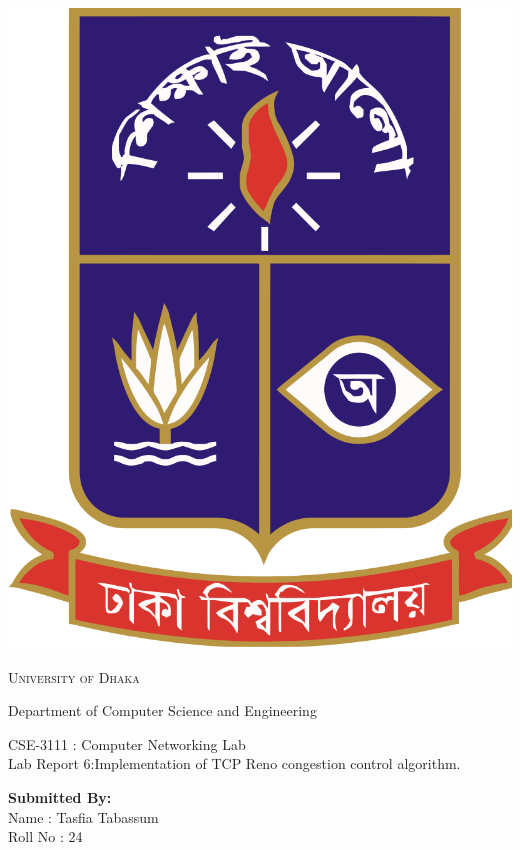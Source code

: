 \documentclass[11pt]{article}
\begin{document}
\begin{titlepage}
	\begin{center}
    	\includegraphics[scale=0.10]{du.png}\par
		\begin{Huge}
			\textsc{University of Dhaka}\par
		\end{Huge}
		\begin{Large}
			Department of Computer Science and Engineering\par \vspace{.5cm}
			CSE-3111 : Computer Networking Lab \\[12pt]	
			Lab Report 6:Implementation of TCP Reno congestion control algorithm.
		\end{Large}
	\end{center}  	
	\begin{large}
		\textbf{Submitted By:\\[12pt]}
			Name : Tasfia Tabassum\\[8pt]
			Roll No : 24\\[12pt]

\end{large}
\end{titlepage}
\end{document}
